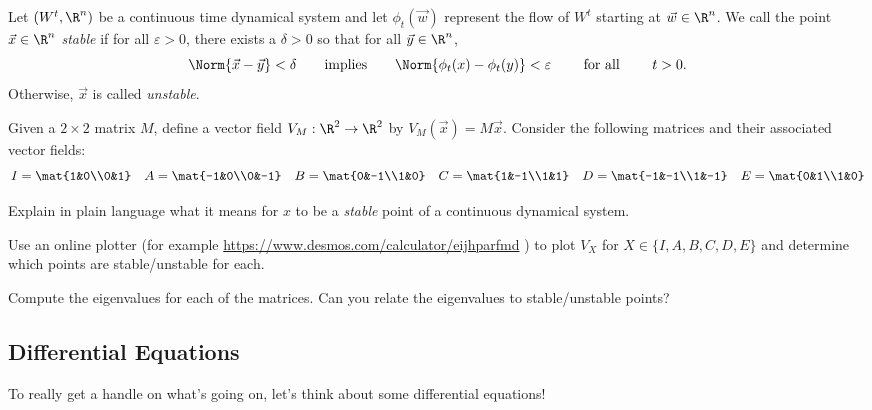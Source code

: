 	\newpage
	\begin{definition}
		Let $(W^t,\R^n)$ be a continuous time dynamical system and let $\phi_t(\vec w)$
		represent the flow of $W^t$ starting at $\vec w\in\R^n$. We call the point $\vec x\in \R^n$ \emph{stable}
		if for all $\varepsilon>0$, there exists a $\delta>0$ so that for all $\vec y\in \R^n$, 
		\[
			\Norm{\vec x-\vec y} < \delta\qquad \text{implies}\qquad
		\Norm{\phi_t(x)-\phi_t(y)} < \varepsilon \qquad \text{ for all }\qquad t > 0.
		\]
		Otherwise, $\vec x$ is called \emph{unstable}.
	\end{definition}

	\question
	Given a $2\times 2$ matrix $M$, define a vector field $V_M:\R^2\to\R^2$ by $V_M(\vec x)=M\vec x$. Consider the following matrices
	and their associated vector fields:
	\[
		I=\mat{1&0\\0&1}\quad
		A=\mat{-1&0\\0&-1}\quad
		B=\mat{0&-1\\1&0}\quad
		C=\mat{1&-1\\1&1}\quad
		D=\mat{-1&-1\\1&-1}\quad
		E=\mat{0&1\\1&0}
	\]
	\begin{parts}
		\item Explain in plain language what it means for $x$ to be a \emph{stable} point of a continuous
			dynamical system.
		\item Use an online plotter (for example \url{https://www.desmos.com/calculator/eijhparfmd} ) to
			plot $V_X$ for $X\in\{I,A,B,C,D,E\}$ and determine which points are stable/unstable for each.
		\item Compute the eigenvalues for each of the matrices. Can you relate the eigenvalues to 
			stable/unstable points?
	\end{parts}

	\newpage
	\subsection*{Differential Equations}
	To really get a handle on what's going on, let's think about some differential equations!

